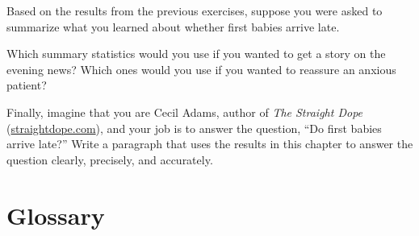 \documentclass[12pt]{book}
\begin{document}
\begin{ex}

Based on the results from the previous exercises, suppose you were
asked to summarize what you learned about whether first
babies arrive late.

Which summary statistics would you use if you wanted to get a story
on the evening news?  Which ones would you use if you wanted to
reassure an anxious patient?


Finally, imagine that you are Cecil Adams, author of {\it The Straight
  Dope} (\url{straightdope.com}), and your job is to answer the
question, ``Do first babies arrive late?''  Write a paragraph that
uses the results in this chapter to answer the question clearly,
precisely, and accurately.

\end{ex}



\section{Glossary}
\end{document}
